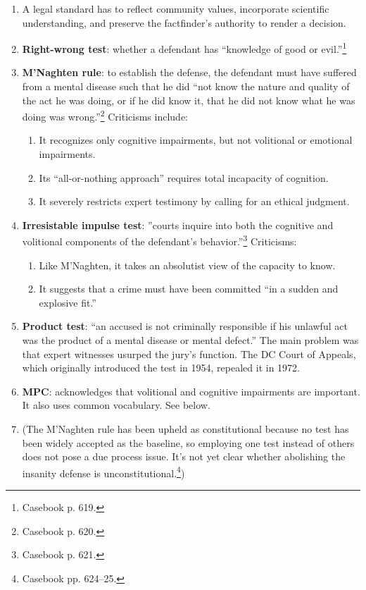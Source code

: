 \begin{enumerate}
    \item A legal standard has to reflect community values, incorporate 
    scientific understanding, and preserve the factfinder's authority to 
    render a decision.
    \item \textbf{Right-wrong test}: whether a defendant has ``knowledge of 
    good or evil.''\footnote{Casebook p. 619.}
    \item \textbf{M'Naghten rule}: to establish the defense, the defendant 
    must have suffered from a mental disease such that he did ``not know the 
    nature and quality of the act he was doing, or if he did know it, that he 
    did not know what he was doing was wrong.''\footnote{Casebook p. 620.} 
    Criticisms include:
    \begin{enumerate}
        \item It recognizes only cognitive impairments, but not volitional or 
        emotional impairments.
        \item Its ``all-or-nothing approach'' requires total incapacity of 
        cognition.
        \item It severely restricts expert testimony by calling for an ethical 
        judgment.
    \end{enumerate}
    \item \textbf{Irresistable impulse test}: ''courts inquire into both the 
    cognitive and volitional components of the defendant's 
    behavior.''\footnote{Casebook p. 621.} Criticisms:
    \begin{enumerate}
        \item Like M'Naghten, it takes an absolutist view of the capacity to 
        know.
        \item It suggests that a crime must have been committed ``in a sudden 
        and explosive fit.''
    \end{enumerate}
    \item \textbf{Product test}: ``an accused is not criminally responsible if 
    his unlawful act was the product of a mental disease or mental defect.'' 
    The main problem was that expert witnesses usurped the jury's function. 
    The DC Court of Appeals, which originally introduced the test in 1954, 
    repealed it in 1972.
    \item \textbf{MPC}: acknowledges that volitional and cognitive impairments 
    are important. It also uses common vocabulary. See below.
    \item (The M'Naghten rule has been upheld as constitutional because no 
    test has been widely accepted as the baseline, so employing one test 
    instead of others does not pose a due process issue. It's not yet clear 
    whether abolishing the insanity defense is 
    unconstitutional.\footnote{Casebook pp. 624--25.})
\end{enumerate}

